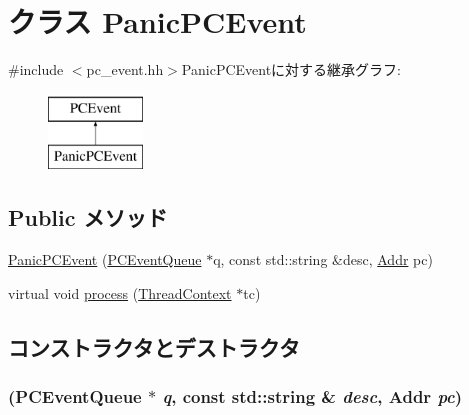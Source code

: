 \hypertarget{classPanicPCEvent}{
\section{クラス PanicPCEvent}
\label{classPanicPCEvent}
}


{\ttfamily \#include $<$pc\_\-event.hh$>$}PanicPCEventに対する継承グラフ:\begin{figure}[H]
\begin{center}
\leavevmode
\includegraphics[height=2cm]{classPanicPCEvent}
\end{center}
\end{figure}
\subsection*{Public メソッド}
\begin{DoxyCompactItemize}
\item 
\hyperlink{classPanicPCEvent_abe83e6eb0bcc8d1567251050acfe1ec0}{PanicPCEvent} (\hyperlink{classPCEventQueue}{PCEventQueue} $\ast$q, const std::string \&desc, \hyperlink{base_2types_8hh_af1bb03d6a4ee096394a6749f0a169232}{Addr} pc)
\item 
virtual void \hyperlink{classPanicPCEvent_ad66a9d5ec7cfe597b848a17c0df5cc28}{process} (\hyperlink{classThreadContext}{ThreadContext} $\ast$tc)
\end{DoxyCompactItemize}


\subsection{コンストラクタとデストラクタ}
\hypertarget{classPanicPCEvent_abe83e6eb0bcc8d1567251050acfe1ec0}{
\subsubsection[{PanicPCEvent}]{ ({\bf PCEventQueue} $\ast$ {\em q}, \/  const std::string \& {\em desc}, \/  {\bf Addr} {\em pc})}}
\label{classPanicPCEvent_abe83e6eb0bcc8d1567251050acfe1ec0}




